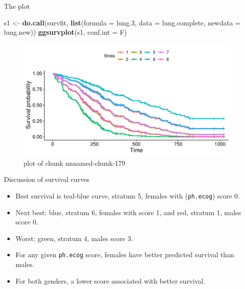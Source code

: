 \documentclass[ignorenonframetext,]{beamer}
\newenvironment{Shaded}{\begin{snugshade}}{\end{snugshade}}
\newcommand{\DataTypeTok}[1]{\textcolor[rgb]{0.13,0.29,0.53}{#1}}
\newcommand{\FloatTok}[1]{\textcolor[rgb]{0.00,0.00,0.81}{#1}}
\newcommand{\KeywordTok}[1]{\textcolor[rgb]{0.13,0.29,0.53}{\textbf{#1}}}
\newcommand{\NormalTok}[1]{#1}
\newcommand{\StringTok}[1]{\textcolor[rgb]{0.31,0.60,0.02}{#1}}
\begin{document}
\begin{frame}[fragile]{The plot}
\protect\hypertarget{the-plot-4}{}

\begin{Shaded}
\begin{Highlighting}[]
\NormalTok{s1 <-}\StringTok{ }\KeywordTok{do.call}\NormalTok{(survfit, }\KeywordTok{list}\NormalTok{(}\DataTypeTok{formula =}\NormalTok{ lung}\FloatTok{.3}\NormalTok{, }\DataTypeTok{data =}\NormalTok{ lung.complete, }\DataTypeTok{newdata =}\NormalTok{ lung.new))}
\KeywordTok{ggsurvplot}\NormalTok{(s1, }\DataTypeTok{conf.int =}\NormalTok{ F)}
\end{Highlighting}
\end{Shaded}

\begin{figure}
\centering
\includegraphics{figure/unnamed-chunk-179-1.pdf}
\caption{plot of chunk unnamed-chunk-179}
\end{figure}

\end{frame}

\begin{frame}[fragile]{Discussion of survival curves}
\protect\hypertarget{discussion-of-survival-curves}{}

\begin{itemize}
\item
  Best survival is teal-blue curve, stratum 5, females with
  (\texttt{ph.ecog}) score 0.
\item
  Next best: blue, stratum 6, females with score 1, and red, stratum 1,
  males score 0.
\item
  Worst: green, stratum 4, males score 3.
\item
  For any given \texttt{ph.ecog} score, females have better predicted
  survival than males.
\item
  For both genders, a lower score associated with better survival.
\end{itemize}

\end{frame}
\end{document}
